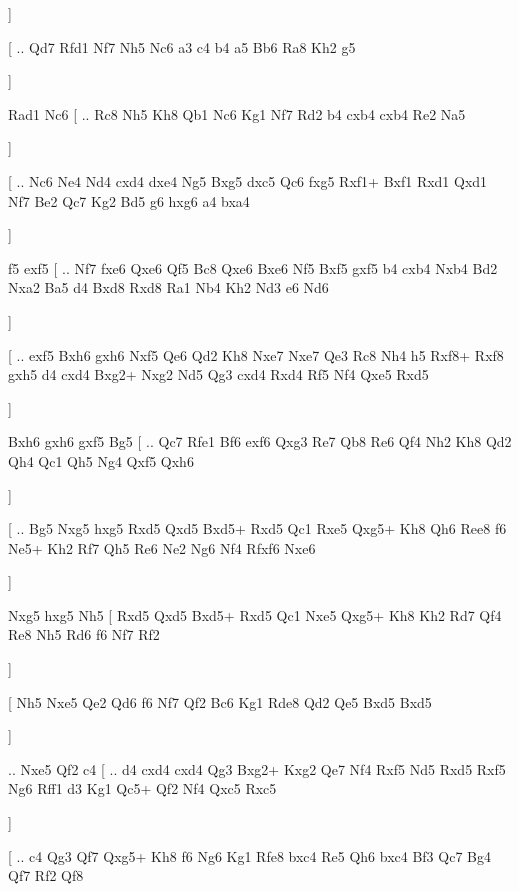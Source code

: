       \dummy  \showboard  ]  
      
      [ .. Qd7  Rfd1 Nf7  Nh5 Nc6  a3 c4  b4 a5  Bb6 Ra8  Kh2 g5   
      
      \dummy  \showboard  ] 
      
       Rad1   Nc6 [ .. Rc8  Nh5 Kh8  Qb1 Nc6  Kg1 Nf7  Rd2 b4  cxb4 cxb4  Re2 Na5   
       
       \dummy  \showboard  ]  
       
       [ .. Nc6  Ne4 Nd4  cxd4 dxe4  Ng5 Bxg5  dxc5 Qc6  fxg5 Rxf1+  Bxf1 Rxd1  Qxd1 Nf7  Be2 Qc7  Kg2 Bd5  g6 hxg6  a4 bxa4   
       
       \dummy  \showboard  ]  
       
       f5   exf5 [ .. Nf7  fxe6 Qxe6  Qf5 Bc8  Qxe6 Bxe6  Nf5 Bxf5  gxf5 b4  cxb4 Nxb4  Bd2 Nxa2  Ba5 d4  Bxd8 Rxd8  Ra1 Nb4  Kh2 Nd3  e6 Nd6   
       
       \dummy  \showboard  ]  
       
       [ .. exf5  Bxh6 gxh6  Nxf5 Qe6  Qd2 Kh8  Nxe7 Nxe7  Qe3 Rc8  Nh4 h5  Rxf8+ Rxf8  gxh5 d4  cxd4 Bxg2+  Nxg2 Nd5  Qg3 cxd4  Rxd4 Rf5  Nf4 Qxe5  Rxd5   
       
       \dummy  \showboard  ]  
       
       Bxh6   gxh6    gxf5   Bg5 [ .. Qc7  Rfe1 Bf6  exf6 Qxg3  Re7 Qb8  Re6 Qf4  Nh2 Kh8  Qd2 Qh4  Qc1 Qh5  Ng4 Qxf5  Qxh6   
       
       \dummy  \showboard  ]  
       
       [ .. Bg5  Nxg5 hxg5  Rxd5 Qxd5  Bxd5+ Rxd5  Qc1 Rxe5  Qxg5+ Kh8  Qh6 Ree8  f6 Ne5+  Kh2 Rf7  Qh5 Re6  Ne2 Ng6  Nf4 Rfxf6  Nxe6   
       
       \dummy  \showboard  ]  
       
       Nxg5   hxg5    Nh5 [  Rxd5 Qxd5  Bxd5+ Rxd5  Qc1 Nxe5  Qxg5+ Kh8  Kh2 Rd7  Qf4 Re8  Nh5 Rd6  f6 Nf7  Rf2   
       
       \dummy  \showboard  ]  
       
       [  Nh5 Nxe5  Qe2 Qd6  f6 Nf7  Qf2 Bc6  Kg1 Rde8  Qd2 Qe5  Bxd5 Bxd5   
       
       \dummy  \showboard  ] 
       
       .. Nxe5    Qf2   c4 [ .. d4  cxd4 cxd4  Qg3 Bxg2+  Kxg2 Qe7  Nf4 Rxf5  Nd5 Rxd5  Rxf5 Ng6  Rff1 d3  Kg1 Qc5+  Qf2 Nf4  Qxc5 Rxc5   
       
       \dummy  \showboard  ]  
       
       [ .. c4  Qg3 Qf7  Qxg5+ Kh8  f6 Ng6  Kg1 Rfe8  bxc4 Re5  Qh6 bxc4  Bf3 Qc7  Bg4 Qf7  Rf2 Qf8   
       
